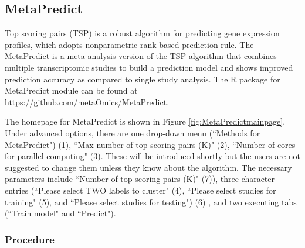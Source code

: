 \subsection{MetaPredict}

Top scoring pairs (TSP) is a robust algorithm for predicting gene expression profiles,
which adopts nonparametric rank-based prediction rule.
The MetaPredict is a meta-analysis version of the TSP algorithm that combines multiple transcriptomic studies to build a prediction model and shows improved 
prediction accuracy as compared to single study analysis.
The R package for MetaPredict module can be found at \url{https://github.com/metaOmics/MetaPredict}.

The homepage for MetaPredict is shown in Figure \ref{fig:MetaPredictmainpage}.
Under advanced options,  there are one drop-down menu (``Methods for MetaPredict") {\color{red} (1)}, 
``Max number of top scoring pairs (K)" {\color{red} (2)}, 
``Number of cores for parallel computing" {\color{red} (3)}.
These will be introduced shortly but the users are not suggested to change them unless they know about the algorithm.
The necessary parameters include ``Number of top scoring pairs (K)" {\color{red} (7)}), 
three character entries (``Please select TWO labels to cluster" {\color{red} (4)}, 
``Please select studies for training" {\color{red} (5)}, 
and ``Please select studies for testing") {\color{red} (6)} , 
and two executing tabs (``Train model" and ``Predict"). 

\subsubsection{Procedure}

